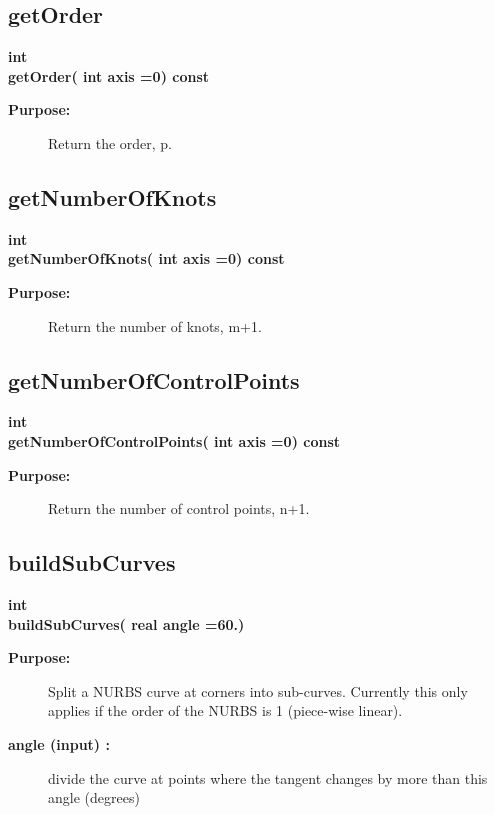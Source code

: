 \subsection{getOrder}
 
\begin{flushleft} \textbf{%
int  \\ 
\settowidth{\NurbsMappingIncludeArgIndent}{getOrder(}%
getOrder( int axis  =0) const
}\end{flushleft}
\begin{description}
\item[{\bf Purpose:}]  
   Return the order, p.
\end{description}
\subsection{getNumberOfKnots}
 
\begin{flushleft} \textbf{%
int  \\ 
\settowidth{\NurbsMappingIncludeArgIndent}{getNumberOfKnots(}%
getNumberOfKnots( int axis  =0) const
}\end{flushleft}
\begin{description}
\item[{\bf Purpose:}]  
  Return the number of knots, m+1.
\end{description}
\subsection{getNumberOfControlPoints}
 
\begin{flushleft} \textbf{%
int  \\ 
\settowidth{\NurbsMappingIncludeArgIndent}{getNumberOfControlPoints(}%
getNumberOfControlPoints( int axis  =0) const
}\end{flushleft}
\begin{description}
\item[{\bf Purpose:}]  
   Return the number of control points, n+1.
\end{description}
\subsection{buildSubCurves}
 
\begin{flushleft} \textbf{%
int  \\ 
\settowidth{\NurbsMappingIncludeArgIndent}{buildSubCurves(}%
buildSubCurves( real angle  =60.)
}\end{flushleft}
\begin{description}
\item[{\bf Purpose:}] 
   Split a NURBS curve at corners into sub-curves. Currently this only applies if the
  order of the NURBS is 1 (piece-wise linear).
\item[{\bf angle (input) :}]  divide the curve at points where the tangent changes by more than
    this angle (degrees)
\end{description}

